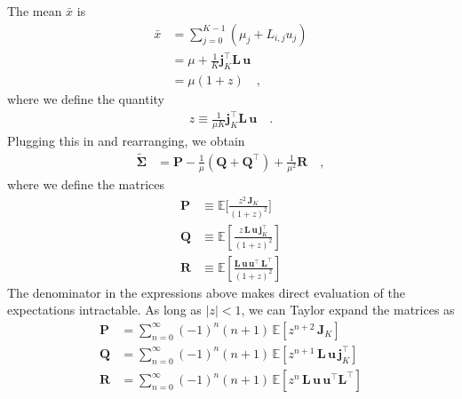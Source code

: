 \documentclass[modern]{aastex62}
\begin{document}
%
The mean $\bar{x}$ is
%
\begin{align}
    \bar{x} & = \sum\limits_{j=0}^{K-1}(\mu_j + L_{i,j}u_j)
    \nonumber                                               \\
            & =
    \mu + \frac{1}{K}\mathbf{j}_K^\top \mathbf{L} \, \mathbf{u}
    \nonumber                                               \\
            & = \mu(1 + z)
    \quad,
\end{align}
%
where we define the quantity
%
\begin{align}
    z \equiv \frac{1}{\mu K}\mathbf{j}_K^\top \mathbf{L} \, \mathbf{u}
    \quad.
\end{align}
%
Plugging this in and rearranging, we obtain
%
\begin{align}
    \label{eq:SigmaPQR}
    \tilde{\pmb{\Sigma}}
     & =
    \mathbf{P}
    -
    \frac{1}{\mu}
    \left(
    \mathbf{Q}
    +
    \mathbf{Q}^\top
    \right)
    +
    \frac{1}{\mu^2}
    \mathbf{R}
    \quad,
\end{align}
%
where we define the matrices
%
\begin{align}
    \label{eq:Pexact}
    \mathbf{P} & \equiv
    \mathbb{E}\Big[
        \frac{z^2 \, \mathbf{J}_K}{(1 + z)^2}
        \Big]
    \\[0.5em]
    \label{eq:Qexact}
    \mathbf{Q} & \equiv
    \mathbb{E}\left[
        \frac{z\, \mathbf{L} \, \mathbf{u} \, \mathbf{j}_K^\top}{(1 + z)^2}
        \right]
    \\[0.5em]
    \label{eq:Rexact}
    \mathbf{R} & \equiv
    \mathbb{E}\left[
        \frac{ \mathbf{L} \, \mathbf{u} \, \mathbf{u}^\top \, \mathbf{L}^\top}{(1 + z)^2}
        \right]
\end{align}
%
The denominator in the expressions above makes direct evaluation of the expectations
intractable. As long as
$\big|z| < 1$, we can Taylor expand the matrices as
%
\begin{align}
    \mathbf{P}
     & =
    \sum\limits_{n=0}^\infty
    (-1)^n (n + 1)
    \,
    \mathbb{E}\left[
        z^{n + 2}
        \,
        \mathbf{J}_K
        \right]
    \\[0.5em]
    \mathbf{Q}
     & =
    \sum\limits_{n=0}^\infty
    (-1)^n (n + 1)
    \,
    \mathbb{E}\left[
        z^{n + 1} \,
        \mathbf{L}
        \,
        \mathbf{u}
        \,
        \mathbf{j}_K^\top
        \right]
    \\[0.5em]
    \mathbf{R}
     & =
    \sum\limits_{n=0}^\infty
    (-1)^n (n + 1)
    \,
    \mathbb{E}\left[
        z^n \, \mathbf{L} \, \mathbf{u} \, \mathbf{u}^\top \mathbf{L}^\top
        \right]
\end{align}
\end{document}
